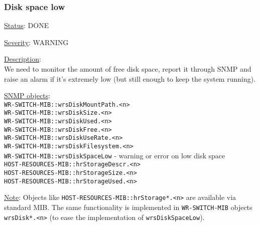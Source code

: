 \subsubsection{\bf Disk space low}
		\label{fail:other:no_disk}
		\begin{packed_enum}
			\item [] \underline{Status}: DONE
			\item [] \underline{Severity}: WARNING
			\item [] \underline{Description}:\\
				We need to monitor the amount of free disk space, report it through SNMP
				and raise an alarm if it's extremely low (but still enough to keep the
				system running).
			\item [] \underline{SNMP objects}:\\
				\texttt{WR-SWITCH-MIB::wrsDiskMountPath.<n>}\\
				\texttt{WR-SWITCH-MIB::wrsDiskSize.<n>}\\
				\texttt{WR-SWITCH-MIB::wrsDiskUsed.<n>}\\
				\texttt{WR-SWITCH-MIB::wrsDiskFree.<n>}\\
				\texttt{WR-SWITCH-MIB::wrsDiskUseRate.<n>}\\
				\texttt{WR-SWITCH-MIB::wrsDiskFilesystem.<n>}\\
				\texttt{WR-SWITCH-MIB::wrsDiskSpaceLow} - warning or error on low disk space\\
				\texttt{HOST-RESOURCES-MIB::hrStorageDescr.<n>}\\
				\texttt{HOST-RESOURCES-MIB::hrStorageSize.<n>}\\
				\texttt{HOST-RESOURCES-MIB::hrStorageUsed.<n>}
			\item [] \underline{Note}:
				Objects like \texttt{HOST-RESOURCES-MIB::hrStorage*.<n>} are available
				via standard MIB. The same functionality is implemented in
				\texttt{WR-SWITCH-MIB} objects \texttt{wrsDisk*.<n>} (to ease the
				implementation of \texttt{wrsDiskSpaceLow}).
		\end{packed_enum}

